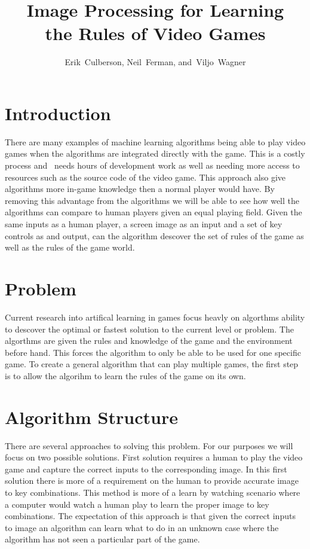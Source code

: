 \documentclass[12pt,journal,compsoc]{IEEEtran}
\begin{document}
\title{Image Processing for Learning\\ the Rules of Video Games}

\author{Erik~Culberson,
        Neil~Ferman,
      and~Viljo~Wagner}


\maketitle

\section{Introduction}

There are many examples of machine learning algorithms being able to play video games when the algorithms are integrated directly with the game. This is a costly process and  needs hours of development work as well as needing more access to resources such as the source code of the video game. This approach also give algorithms more in-game knowledge then a normal player would have. By removing this advantage from the algorithms we will be able to see how well the algorithms can compare to human players given an equal playing field. Given the same inputs as a human player, a screen image as an input and a set of key controls as and output, can the algorithm descover the set of rules of the game as well as the rules of the game world.

\section{Problem}

Current research into artifical learning in games focus heavly on algorthms ability to descover the optimal or fastest solution to the current level or problem. The algorthms are given the rules and knowledge of the game and the environment before hand. This forces the algorithm to only be able to be used for one specific game. To create a general algorithm that can play multiple games, the first step is to allow the algorihm to learn the rules of the game on its own.

\section{Algorithm Structure}
  There are several approaches to solving this problem. For our purposes we will focus on two possible solutions. First solution requires a human to play the video game and capture the correct inputs to the corresponding image. In this first solution there is more of a requirement on the human to provide accurate image to key combinations. This method is more of a learn by watching scenario where a computer would watch a human play to learn the proper image to key combinations. The expectation of this approach is that given the correct inputs to image an algorithm can learn what to do in an unknown case where the algorithm has not seen a particular part of the game.
\end{document}
